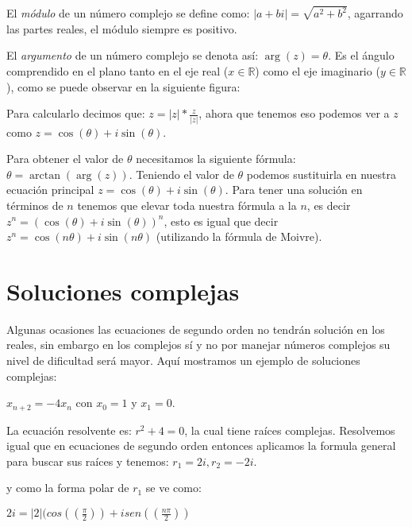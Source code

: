 \documentclass{report}
\begin{document}
El \textit{módulo} de un número complejo se define como:
$|a+bi|=\sqrt{a^2+b^2}$, agarrando las partes reales, el módulo
siempre es positivo.

El \textit{argumento} de un número complejo se denota así: $\arg(z)=\theta$. Es
el ángulo comprendido en el plano tanto en el eje real
($x\in\mathbb{R}$) como el eje imaginario ($y\in\mathbb{R}$), como se puede observar en la siguiente figura:
\begin{center}
\end{center}
Para calcularlo decimos que:
$z=|z|*\frac{z}{|z|}$, ahora que tenemos eso podemos ver a $z$ como
$z=\cos(\theta)+i\sin(\theta)$.

Para obtener el valor de $\theta$
necesitamos la siguiente fórmula: $\theta=\arctan(\arg(z))$. Teniendo el
valor de $\theta$ podemos sustituirla en nuestra ecuación principal
$z=\cos(\theta)+i\sin(\theta)$. Para tener una solución en términos de
$n$ tenemos que elevar toda nuestra fórmula a la $n$, es decir
$z^n=(\cos(\theta)+i\sin(\theta))^n$, esto es igual que decir
$z^n=\cos(n\theta)+i\sin(n\theta)$ (utilizando la fórmula de Moivre).

\section{Soluciones complejas}
\label{sec:complejas}

Algunas ocasiones las ecuaciones de segundo orden no tendrán solución
en los reales, sin embargo en los complejos sí y no por manejar
números complejos su nivel de dificultad será mayor. Aquí mostramos un
ejemplo de soluciones complejas: 

$x_{n+2}=-4x_{n}$ con $x_0=1$ y $x_1=0$.

La ecuación resolvente es: $r^2+4=0$, la cual tiene raíces complejas.
Resolvemos igual que en ecuaciones de segundo orden entonces aplicamos
la formula general para buscar sus raíces y tenemos: $r_1=2i,r_2=-2i$.

y como la forma polar de $r_1$
se ve como:

$2i=|2|(cos((\frac{\pi}{2}))+isen((\frac{n\pi}{2}))$
\end{document}
